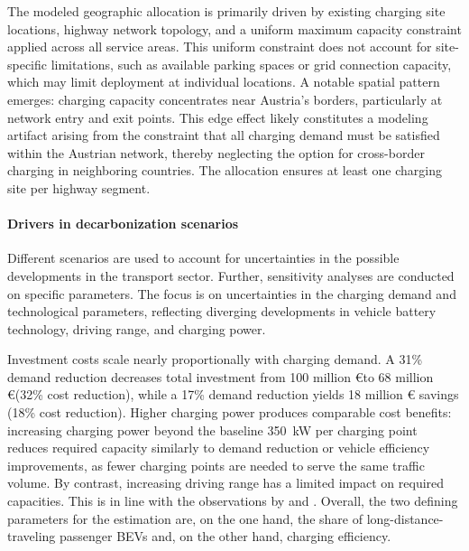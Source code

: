 The modeled geographic allocation is primarily driven by existing charging site locations, highway network topology, and a uniform maximum capacity constraint applied across all service areas. This uniform constraint does not account for site-specific limitations, such as available parking spaces or grid connection capacity, which may limit deployment at individual locations. A notable spatial pattern emerges: charging capacity concentrates near Austria's borders, particularly at network entry and exit points. This edge effect likely constitutes a modeling artifact arising from the constraint that all charging demand must be satisfied within the Austrian network, thereby neglecting the option for cross-border charging in neighboring countries. The allocation ensures at least one charging site per highway segment.

\paragraph*{Drivers in decarbonization scenarios}
Different scenarios are used to account for uncertainties in the possible developments in the transport sector. Further, sensitivity analyses are conducted on specific parameters. The focus is on uncertainties in the charging demand and technological parameters, reflecting diverging developments in vehicle battery technology, driving range, and charging power.

Investment costs scale nearly proportionally with charging demand. A 31\% demand reduction decreases total investment from 100 million \euro to 68 million \euro (32\% cost reduction), while a 17\% demand reduction yields 18 million \euro{} savings (18\% cost reduction). Higher charging power produces comparable cost benefits: increasing charging power beyond the baseline 350~kW per charging point reduces required capacity similarly to demand reduction or vehicle efficiency improvements, as fewer charging points are needed to serve the same traffic volume. By contrast, increasing driving range has a limited impact on required capacities. This is in line with the observations by \citet{Wang2018} and \citet{NUGROHO2025101470}. 
Overall, the two defining parameters for the estimation are, on the one hand, the share of long-distance-traveling passenger \acp{BEV} and, on the other hand, charging efficiency. 

